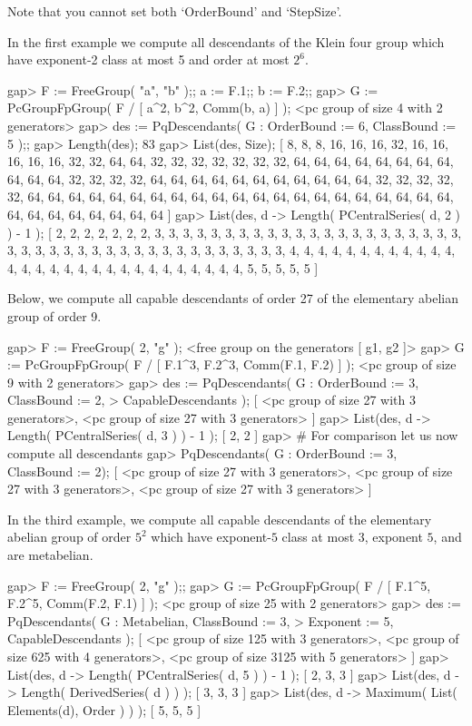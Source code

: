 Note that you cannot set both `OrderBound' and `StepSize'.

In the first example  we  compute all descendants of the Klein four group
which have exponent-2 class at most 5 and order at most $2^6$.

\beginexample
gap> F := FreeGroup( "a", "b" );; a := F.1;; b := F.2;;         
gap> G := PcGroupFpGroup( F / [ a^2, b^2, Comm(b, a) ] );
<pc group of size 4 with 2 generators>
gap> des := PqDescendants( G : OrderBound := 6, ClassBound := 5 );;
gap> Length(des);
83
gap> List(des, Size); 
[ 8, 8, 8, 16, 16, 16, 32, 16, 16, 16, 16, 16, 32, 32, 64, 64, 32, 32, 32, 
  32, 32, 32, 32, 64, 64, 64, 64, 64, 64, 64, 64, 64, 64, 64, 32, 32, 32, 32, 
  64, 64, 64, 64, 64, 64, 64, 64, 64, 64, 64, 32, 32, 32, 32, 32, 64, 64, 64, 
  64, 64, 64, 64, 64, 64, 64, 64, 64, 64, 64, 64, 64, 64, 64, 64, 64, 64, 64, 
  64, 64, 64, 64, 64, 64, 64 ]
gap> List(des, d -> Length( PCentralSeries( d, 2 ) ) - 1 );
[ 2, 2, 2, 2, 2, 2, 2, 3, 3, 3, 3, 3, 3, 3, 3, 3, 3, 3, 3, 3, 3, 3, 3, 3, 3, 
  3, 3, 3, 3, 3, 3, 3, 3, 3, 3, 3, 3, 3, 3, 3, 3, 3, 3, 3, 3, 3, 3, 3, 3, 4, 
  4, 4, 4, 4, 4, 4, 4, 4, 4, 4, 4, 4, 4, 4, 4, 4, 4, 4, 4, 4, 4, 4, 4, 4, 4, 
  4, 4, 4, 5, 5, 5, 5, 5 ]
\endexample

Below, we compute all capable descendants of order 27 of  the  elementary
abelian group of order 9.

\beginexample
gap> F := FreeGroup( 2, "g" );
<free group on the generators [ g1, g2 ]>
gap> G := PcGroupFpGroup( F / [ F.1^3, F.2^3, Comm(F.1, F.2) ] );
<pc group of size 9 with 2 generators>
gap> des := PqDescendants( G : OrderBound := 3, ClassBound := 2,
>                              CapableDescendants );
[ <pc group of size 27 with 3 generators>, 
  <pc group of size 27 with 3 generators> ]
gap> List(des, d -> Length( PCentralSeries( d, 3 ) ) - 1 );
[ 2, 2 ]
gap> # For comparison let us now compute all descendants
gap> PqDescendants( G : OrderBound := 3, ClassBound := 2);
[ <pc group of size 27 with 3 generators>, 
  <pc group of size 27 with 3 generators>, 
  <pc group of size 27 with 3 generators> ]
\endexample

In  the  third  example,  we  compute  all  capable  descendants  of  the
elementary abelian group of order  $5^2$ which have exponent-$5$ class at
most $3$, exponent $5$, and are metabelian.

\beginexample
gap> F := FreeGroup( 2, "g" );;                                  
gap> G := PcGroupFpGroup( F / [ F.1^5, F.2^5, Comm(F.2, F.1) ] );
<pc group of size 25 with 2 generators>
gap> des := PqDescendants( G : Metabelian, ClassBound := 3,
>                              Exponent := 5, CapableDescendants );
[ <pc group of size 125 with 3 generators>, 
  <pc group of size 625 with 4 generators>, 
  <pc group of size 3125 with 5 generators> ]
gap> List(des, d -> Length( PCentralSeries( d, 5 ) ) - 1 );
[ 2, 3, 3 ]
gap> List(des, d -> Length( DerivedSeries( d ) ) );
[ 3, 3, 3 ]
gap> List(des, d -> Maximum( List( Elements(d), Order ) ) );     
[ 5, 5, 5 ]
\endexample

